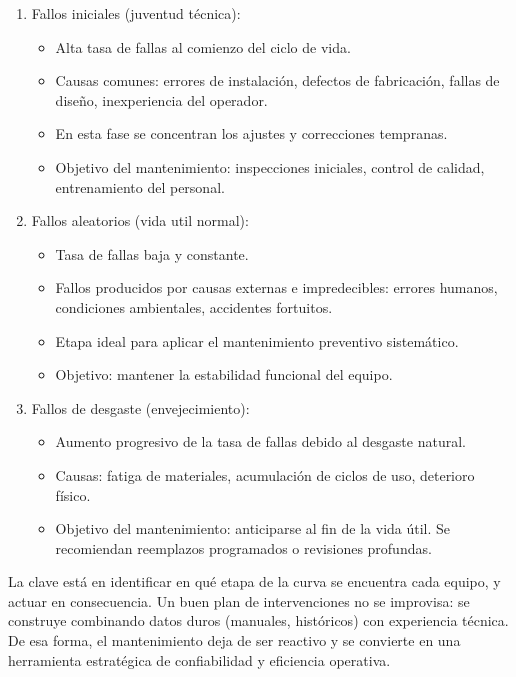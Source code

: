 \documentclass[a4paper,oneside,11pt]{article}
\begin{document}
\begin{enumerate}
    \begin{enumerate}
        \item Fallos iniciales (juventud técnica):
            \begin{itemize}
                \item Alta tasa de fallas al comienzo del ciclo de vida.
                \item Causas comunes: errores de instalación, defectos de fabricación, fallas de diseño, inexperiencia del operador.
                \item En esta fase se concentran los ajustes y correcciones tempranas.
                \item Objetivo del mantenimiento: inspecciones iniciales, control de calidad, entrenamiento del personal.
            \end{itemize}
        \item Fallos aleatorios (vida util normal):
        \begin{itemize}
            \item Tasa de fallas baja y constante.
            \item Fallos producidos por causas externas e impredecibles: errores humanos, condiciones ambientales, accidentes fortuitos.
            \item Etapa ideal para aplicar el mantenimiento preventivo sistemático.
            \item Objetivo: mantener la estabilidad funcional del equipo.
        \end{itemize}
        \item Fallos de desgaste (envejecimiento):
            \begin{itemize}
                \item Aumento progresivo de la tasa de fallas debido al desgaste natural.
                \item Causas: fatiga de materiales, acumulación de ciclos de uso, deterioro físico.
                \item Objetivo del mantenimiento: anticiparse al fin de la vida útil. Se recomiendan reemplazos programados o revisiones profundas.
            \end{itemize}
    \end{enumerate}

    La clave está en identificar en qué etapa de la curva se encuentra cada equipo, y actuar en consecuencia. Un buen plan de intervenciones no se improvisa: se construye combinando datos duros (manuales, históricos) con experiencia técnica. De esa forma, el mantenimiento deja de ser reactivo y se convierte en una herramienta estratégica de confiabilidad y eficiencia operativa.


\end{enumerate}
\end{document}

